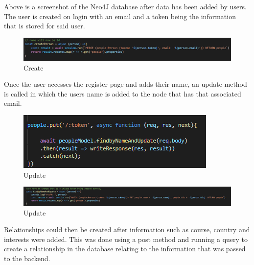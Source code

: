 Above is a screenshot of the Neo4J database after data has been added by users. The user is created on login with an email and a token being the information that is stored for said user.\\

\begin{figure}[H]
    \centering
    \includegraphics{img/Backend2.png}
    \caption{Create} 
    \label{fig:my_label}
\end{figure}

Once the user accesses the register page and adds their name, an update method is called in which the users name is added to the node that has that associated email. \\

\begin{figure}[H]
    \centering
    \includegraphics{img/backend3.png}
    \caption{Update} 
    \label{fig:my_label}
\end{figure}
\begin{figure}[H]
    \centering
    \includegraphics[width=14cm]{img/backend4.png}
    \caption{Update} 
    \label{fig:my_label}
\end{figure}

Relationships could then be created after information such as course, country and interests were added. This was done using a post method and running a query to create a relationship in the database relating to the information that was passed to the backend.  \\

